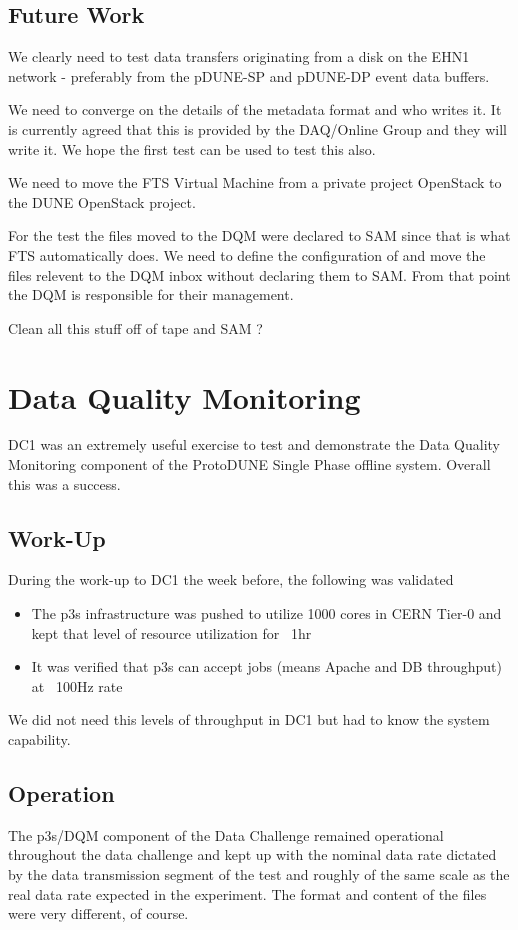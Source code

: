 \documentclass[pdftex,12pt,letter]{article}
\begin{document}
\subsection {Future Work}
We clearly need to test data transfers originating from a disk on the EHN1 network - preferably from the pDUNE-SP and pDUNE-DP event data buffers. 

We need to converge on  the details of the metadata format and who writes it. It is currently agreed that this is provided by the DAQ/Online Group and they will write it. We hope the first test can be used to test this also. 

We need to move the FTS Virtual Machine from a private project OpenStack to the  DUNE OpenStack project. 

For the test the files moved to the DQM were declared to SAM since that is what FTS automatically does. We need to define the configuration of and move the files relevent to the DQM inbox without declaring them to SAM. From that point the DQM is responsible for their management.

Clean all this stuff off of tape and SAM
?


\section {Data Quality Monitoring}
DC1 was an extremely useful exercise to test and demonstrate the Data Quality Monitoring component of the ProtoDUNE Single Phase offline system. Overall this was a success.

\subsection{Work-Up}

During the work-up to DC1 the week before, the following was validated
\begin{itemize}
\item The p3s infrastructure was pushed to utilize 1000 cores in CERN Tier-0 and kept that level of resource utilization for ~1hr
\item It was verified that p3s can accept jobs (means Apache and DB throughput) at ~100Hz rate
\end{itemize}

We did not need this levels of throughput in DC1 but had to know the system capability.

\subsection{Operation}
The p3s/DQM component of the Data Challenge remained operational throughout the data challenge  and kept up with the nominal data rate dictated by the data transmission segment of the test and roughly of the same scale as the real data rate expected in the experiment. The format and content of the files were very different, of course.
\end{document}
